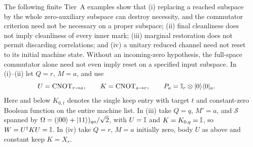 \begin{counterexample}\label{ex:sA-rec-limits}
The following finite Tier~A examples show that (i) replacing a reached
subspace by the whole zero-auxiliary subspace can destroy necessity,
and the commutator criterion need not be necessary on a proper subspace;
(ii) final cleanliness does not imply cleanliness of every inner mark;
(iii) marginal restoration does not permit discarding correlations; and
(iv) a unitary reduced channel need not reset to its initial machine state.
Without an incoming-zero hypothesis, the full-space commutator alone
need not even imply reset on a specified input subspace.
In (i)--(ii) let $Q=r$, $M=a$, and use
\[
 U=\operatorname{CNOT}_{r\to a},\qquad
 K=\operatorname{CNOT}_{a\to r},\qquad
 P_a=\mathbb{I}_r\otimes\lvert 0\rangle\langle 0\rvert_a.
\]
Here and below $K_{0,t}$ denotes the single keep entry with target $t$
and constant-zero Boolean function on the entire machine list.
In (iii) take $Q=q$, $M'=a$, and $\mathcal S$ spanned by
$\Omega=(\lvert 00\rangle+\lvert 11\rangle)_{qa}/\sqrt2$, with $U=\mathbb{I}$ and
$K=K_{0,q}=\mathbb{I}$, so $W=U^\dagger KU=\mathbb{I}$.
In (iv) take $Q=r$, $M=a$ initially zero, body $U$ as above and constant
keep $K=X_r$.
\end{counterexample}
